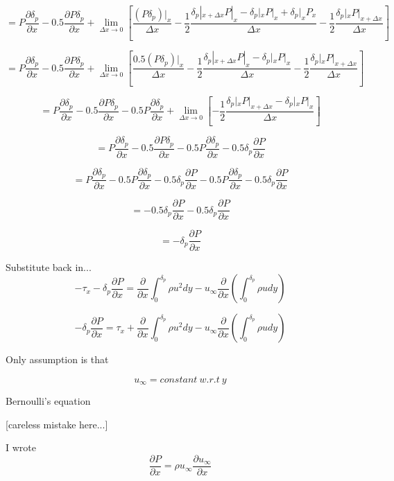 \documentclass[11pt]{article}
\begin{document}
$$= P \frac{\partial \delta_p}{\partial x} - 0.5 \frac{\partial P\delta_p}{\partial x} + \lim_{\Delta x \rightarrow 0} [ \frac{(P \delta_p)|_x}{\Delta x}  - \frac{1}{2} \frac{ \delta_p|_{x+\Delta x} P|_x - \delta_p |_x P|_x + \delta_p |_x P_x }{\Delta x} - \frac{1}{2} \frac{\delta_p|_{x} P|_{x+\Delta x}}{\Delta x}  ] $$


$$= P \frac{\partial \delta_p}{\partial x} -0.5 \frac{\partial P\delta_p}{\partial x} + \lim_{\Delta x \rightarrow 0} [ \frac{0.5(P \delta_p)|_x}{\Delta x}  - \frac{1}{2} \frac{ \delta_p|_{x+\Delta x} P|_x - \delta_p |_x P|_x}{\Delta x} - \frac{1}{2} \frac{\delta_p|_{x} P|_{x+\Delta x}}{\Delta x}  ] $$

$$= P \frac{\partial \delta_p}{\partial x} -0.5 \frac{\partial P\delta_p}{\partial x} - 0.5 P \frac{\partial \delta_p}{\partial x} + \lim_{\Delta x \rightarrow 0} [  - \frac{1}{2} \frac{\delta_p|_{x} P|_{x+\Delta x} - \delta_p |_x P|_x}{\Delta x}  ] $$

$$= P \frac{\partial \delta_p}{\partial x} -0.5 \frac{\partial P\delta_p}{\partial x} - 0.5 P \frac{\partial \delta_p}{\partial x}  -  0.5 \delta_p \frac{\partial P}{\partial x}$$

$$=P \frac{\partial \delta_p}{\partial x} - 0.5 P \frac{\partial \delta_p}{\partial x}  - 0.5\delta_p \frac{\partial P}{\partial x} - 0.5 P \frac{\partial \delta_p}{\partial x}  -  0.5 \delta_p \frac{\partial P}{\partial x}$$

$$=  - 0.5\delta_p \frac{\partial P}{\partial x} -  0.5 \delta_p \frac{\partial P}{\partial x}$$

$$=  -  \delta_p \frac{\partial P}{\partial x}$$

Substitute back in...
$$ -\tau_x -  \delta_p \frac{\partial P}{\partial x} =  \frac{\partial }{\partial x} \int_0^{\delta_p} \rho u^2 dy    - u_\infty  \frac{\partial }{\partial x} (\int_0^{\delta_p } \rho u dy )   $$

$$ -  \delta_p \frac{\partial P}{\partial x} = \tau_x + \frac{\partial }{\partial x} \int_0^{\delta_p} \rho u^2 dy    - u_\infty \frac{\partial }{\partial x} ( \int_0^{\delta_p } \rho u dy )   $$

Only assumption is that

$$u_\infty = constant \ w.r.t \ y$$

Bernoulli's equation

[careless mistake here...]

I wrote
$$\frac{\partial P}{\partial x} = \rho u_\infty \frac{\partial u_\infty}{\partial x}$$
\end{document}
